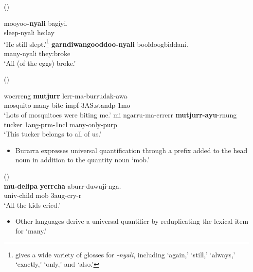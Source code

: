 \documentclass{article}
\begin{document}
\begin{exe}
 (\citealt[463-464]{mcgregor90})
\begin{xlist}
\ex \gll mooyoo\textbf{-nyali} bagiyi.\\
sleep-{\sc nyali} he:lay\\
\glt `He still slept.'\footnote{\cite{mcgregor90} gives a wide variety of glosses for {\it -nyali}, including `again,' `still,' `always,' `exactly,' `only,' and `also.'}
\ex \gll \textbf{garndiwangooddoo-nyali} booldoogbiddani.\\
many-{\sc nyali} they:broke\\
\glt `All (of the eggs) broke.'
\end{xlist}
 (\citealt[]{zandvoort99})
\begin{xlist}
\ex \gll woerreng \textbf{mutjurr} lerr-ma-burrudak-awa\\
mosquito many bite-{\sc impf}-3AS.stand{\sc p}-1{\sc mo}\\
\glt `Lots of mosquitoes were biting me.'%
\ex \gll mi ngarru-ma-errerr \textbf{mutjurr-ayu}-rnung\\
tucker 1{\sc aug-prm}-1{\sc ncl} many-only-{\sc purp}\\
\glt `This tucker belongs to all of us.'%

\end{xlist}
\end{exe}

\begin{itemize}
    \item Burarra expresses universal quantification through a prefix added to the head noun in addition to the quantity noun `mob.'
\end{itemize}

\begin{exe}
 (\citealt[34]{green87}) \\
\gll \textbf{mu-delipa}     \textbf{yerrcha}     aburr-duwuji-nga.\\
{\sc univ}-child    mob        3{\sc aug}-cry-{\sc r}\\
\glt `All the kids cried.'
\end{exe}

\begin{itemize}
    \item Other languages derive a universal quantifier by reduplicating the lexical item for `many.'
\end{itemize}
\end{document}
